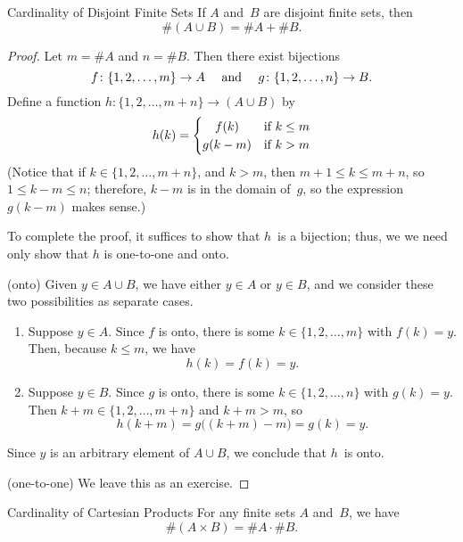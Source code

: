 \documentclass[../MATH-2000-Notes.tex]{subfiles}
\begin{document}
\begin{Proposition}
    {Cardinality of Disjoint Finite Sets}
    \label{|AcupB|}
    If $A$ and~$B$ are disjoint finite sets, then
    $$ \# (A \cup B) = \#A + \# B .$$
\end{Proposition}
\begin{proof}
    Let $m = \#A$ and $n = \# B$. Then there exist bijections
    $$ \text{$f \colon \{1,2,\ldots,m\} \to A$ \quad and \quad $g \colon \{1,2,\ldots,n\} \to B$.} $$
    Define a function $h \colon \{1,2,\ldots,m+n\} \to (A \cup B)$ by
    $$ h(k) = \begin{cases}
            \hfil f(k) & \text{if $k \le m$} \\
            g(k-m)     & \text{if $k > m$}
        \end{cases} $$
    (Notice that if $k \in \{1,2,\ldots,m+n\}$, and $k > m$, then $m + 1 \le k \le m+n$, so $1 \le k - m \le n$; therefore, $k -m$ is in the domain of~$g$, so the expression $g(k-m)$ makes sense.)

    To complete the proof, it suffices to show that $h$~is a bijection; thus, we we need only show that $h$ is one-to-one and onto.

    (onto) Given $y \in A \cup B$, we have either $y \in A$ or $y \in B$, and we consider these two possibilities as separate cases.
    \begin{enumerate}
        \item Suppose $y \in A$. Since $f$ is onto, there is some $k \in \{1,2,\ldots,m\}$ with $f(k) = y$. Then, because $k \le m$, we have
              $$ h(k) = f(k) = y .$$
        \item Suppose $y \in B$. Since $g$ is onto, there is some $k \in \{1,2,\ldots,n\}$ with $g(k) = y$. Then $k + m \in \{1,2,\ldots,m+n\}$ and $k+m > m$, so
              $$ h(k+m) = g \bigl( (k+m) - m \bigr) = g(k) = y .$$
    \end{enumerate}
    Since $y$ is an arbitrary element of $A \cup B$, we conclude that $h$~is onto.

    (one-to-one) We leave this as an exercise.
\end{proof}

\begin{Theorem}
    {Cardinality of Cartesian Products}
    \label{Card(AxB)Thm}
    For any finite sets $A$ and~$B$, we have
    $$\#(A \times B) = \#A \cdot \#B .$$
\end{Theorem}
\end{document}
